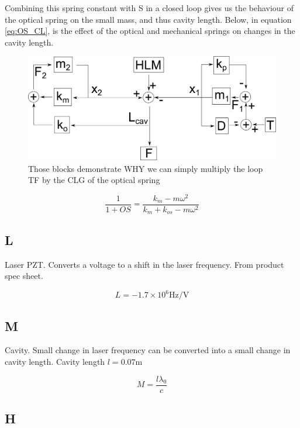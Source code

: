 Combining this spring constant with S in a closed loop gives us the behaviour of the optical spring on the small mass, and thus cavity length.  Below, in equation \ref{eq:OS_CL}, is the effect of the optical and mechanical springs on changes in the cavity length.

\begin{figure}%
\includegraphics[width=\columnwidth]{figures/controls/blocks2.png}%
\caption{Those blocks demonstrate WHY we can simply multiply the loop TF by the CLG of the optical spring }%
\label{fig:blocks2}%
\end{figure}

\begin{equation}
\frac{1}{1+OS} = \frac{k_m-m\omega^2}{k_m+k_{os}-m\omega^2}
\label{eq:OS_CL}
\end{equation}

\subsection{L}

Laser PZT.  Converts a voltage to a shift in the laser frequency. From product spec sheet.

\begin{equation}
L = -1.7\times 10^6 \mbox{Hz/V}
\label{eq:L}
\end{equation}

\subsection{M}

Cavity.  Small change in laser frequency can be converted into a small change in cavity length.  Cavity length $l = 0.07\mbox{m}$

\begin{equation}
M=\frac{l\lambda_0}{c}
\label{eq:loopM}
\end{equation}


\subsection{H}

